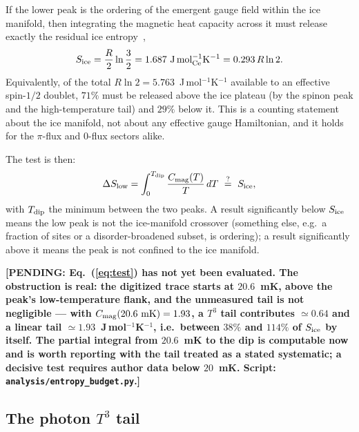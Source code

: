 \documentclass[aps,prb,preprint,amsmath,amssymb,superscriptaddress,
longbibliography,floatfix]{revtex4-2}
\newcommand{\pending}[1]{{\color{red}\textbf{[PENDING: #1]}}}
\begin{document}
If the lower peak is the ordering of the emergent gauge field within the ice
manifold, then integrating the magnetic heat capacity across it must release
exactly the residual ice entropy~\cite{Pauling1935,Ramirez1999},
\begin{equation}
 S_{\rm ice}=\frac{R}{2}\ln\frac32
 =1.687\ \mathrm{J\,mol_{Ce}^{-1}K^{-1}}
 =0.293\,R\ln2 .
 \label{eq:pauling}
\end{equation}
Equivalently, of the total $R\ln2=5.763$~J\,mol$^{-1}$K$^{-1}$ available to an
effective spin-$1/2$ doublet, $71\%$ must be released above the ice plateau (by
the spinon peak and the high-temperature tail) and $29\%$ below it.  This is a
counting statement about the ice manifold, not about any effective gauge
Hamiltonian, and it holds for the $\pi$-flux and $0$-flux sectors alike.

The test is then:
\begin{equation}
 \Delta S_{\rm low}=\int_0^{T_{\rm dip}}\frac{C_{\rm mag}(T)}{T}\,dT
 \ \stackrel{?}{=}\ S_{\rm ice},
 \label{eq:test}
\end{equation}
with $T_{\rm dip}$ the minimum between the two peaks.  A result significantly
below $S_{\rm ice}$ means the low peak is not the ice-manifold crossover
(something else, e.g.\ a fraction of sites or a disorder-broadened subset, is
ordering); a result significantly above it means the peak is not confined to
the ice manifold.

\pending{Eq.~(\ref{eq:test}) has not yet been evaluated.  The obstruction is
real: the digitized trace starts at $20.6$~mK, above the peak's low-temperature
flank, and the unmeasured tail is not negligible --- with
$C_{\rm mag}(20.6~\mathrm{mK})=1.93$, a $T^3$ tail contributes
$\simeq0.64$ and a linear tail $\simeq1.93$~J\,mol$^{-1}$K$^{-1}$, i.e.\
between $38\%$ and $114\%$ of $S_{\rm ice}$ by itself.  The partial integral
from $20.6$~mK to the dip is computable now and is worth reporting with the
tail treated as a stated systematic; a decisive test requires author data below
$20$~mK.  Script: \texttt{analysis/entropy\_budget.py}.}

\subsection{The photon $T^3$ tail}
\end{document}
